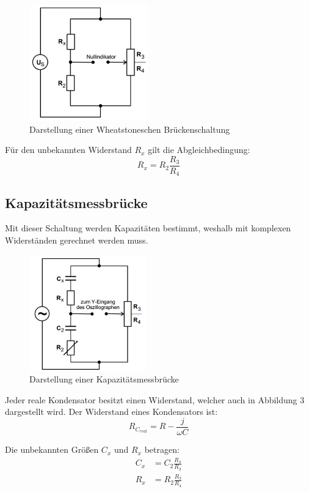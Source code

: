\begin{figure}[H]
  \centering
  \includegraphics[height=5cm]{wheat.PNG}
  \caption{Darstellung einer Wheatstoneschen Brückenschaltung}
  \label{fig:Wheat}
\end{figure}

Für den unbekannten Widerstand $R_x$ gilt die Abgleichbedingung:
\begin{equation}
  R_x = R_2 \frac{R_3}{R_4}
\end{equation}

\subsection{Kapazitätsmessbrücke}
Mit dieser Schaltung werden Kapazitäten bestimmt, weshalb mit komplexen Widerständen gerechnet werden muss.

\begin{figure}[H]
  \centering
  \includegraphics[height=5cm]{kapazitaet.PNG}
  \caption{Darstellung einer Kapazitätsmessbrücke}
  \label{fig:kapazität}
\end{figure}

Jeder  reale Kondensator besitzt einen Widerstand, welcher auch in Abbildung 3 dargestellt wird.
Der Widerstand eines Kondensators ist:
\begin{equation}
  R_{C_{real}} = R - \frac{j}{\omega C}
\end{equation}

Die unbekannten Größen $C_x$ und $R_x$ betragen:
\begin{align}
  C_x &= C_2 \frac{R_4}{R_3} \\
  R_x &= R_2 \frac{R_3}{R_4}
\end{align}

